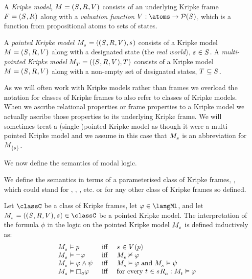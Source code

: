\begin{definition}
A {\em Kripke model}, $\kModelAndTuple$ consists of an underlying Kripke frame $\kFrameAndTuple$ along with a {\em valuation function} $\kValuation : \atoms \to \powerset(\kStates)$, which is a function from propositional atoms to sets of states.

A {\em pointed Kripke model} $\kPModelAndTuple{\kStateS}$ consists of a Kripke model $\kModelAndTuple$ along with a designated state (the {\em real world}), $\kStateS \in \kStates$.
A {\em multi-pointed Kripke model} $\kPModelAndTuple{\kStatesT}$ consists of a Kripke model $\kModelAndTuple$ along with a non-empty set of designated states, $\kStatesT \subseteq \kStates$.
\end{definition}

As we will often work with Kripke models rather than frames we overload the notation for classes of Kripke frames to also refer to classes of Kripke models.
When we ascribe relational properties or frame properties to a Kripke model we actually ascribe those properties to its underlying Kripke frame.
We will sometimes treat a (single-)pointed Kripke model as though it were a multi-pointed Kripke model and we assume in this case that $\kPModel{\kStateS}$ is an abbreviation for $\kPModel{\{\kStateS\}}$.

We now define the semantics of modal logic.

We define the semantics in terms of a parameterised class of Kripke frames, \classC{}, which could stand for \classK{}, \classKF{}, \classKFF{}, etc. or for any other class of Kripke frames so defined.

\begin{definition}\label{ml-semantics}
Let $\classC$ be a class of Kripke frames, let $\phi \in \langMl$, and let $\kPModelAndTuple{\kStateS} \in \classC$ be a pointed Kripke model.
The interpretation of the formula $\phi$ in the logic \logicC{} on the pointed Kripke model $\kPModel{\kStateS}$ is defined inductively as:
$$
\begin{array}{lcl}
\kPModel{\kStateS} \entails \atomP & \text{ iff } & \kStateS \in \kValuation(\atomP)\\
\kPModel{\kStateS} \entails \lnot \phi & \text{ iff } & \kPModel{\kStateS} \nentails \phi\\
\kPModel{\kStateS} \entails \phi \land \psi & \text{ iff } & \kPModel{\kStateS} \entails \phi \text{ and } \kPModel{\kStateS} \entails \psi\\
\kPModel{\kStateS} \entails \necessaryA \phi & \text{ iff } & \text{for every } \kStateT \in \kSuccessorsA{\kStateS} : \kPModel{\kStateT} \entails \phi
\end{array}
$$
\end{definition}

